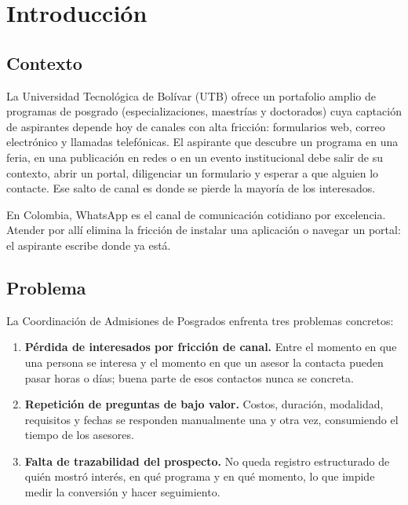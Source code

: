 \documentclass[12pt,a4paper]{report}
\begin{document}
\section{Introducción}

\subsection{Contexto}

La Universidad Tecnológica de Bolívar (UTB) ofrece un portafolio amplio de programas de posgrado
(especializaciones, maestrías y doctorados) cuya captación de aspirantes depende hoy de canales
con alta fricción: formularios web, correo electrónico y llamadas telefónicas. El aspirante que
descubre un programa en una feria, en una publicación en redes o en un evento institucional debe
salir de su contexto, abrir un portal, diligenciar un formulario y esperar a que alguien lo
contacte. Ese salto de canal es donde se pierde la mayoría de los interesados.

En Colombia, WhatsApp es el canal de comunicación cotidiano por excelencia. Atender por allí elimina
la fricción de instalar una aplicación o navegar un portal: el aspirante escribe donde ya está.

\subsection{Problema}

La Coordinación de Admisiones de Posgrados enfrenta tres problemas concretos:

\begin{enumerate}[itemsep=2pt]
    \item \textbf{Pérdida de interesados por fricción de canal.} Entre el momento en que una persona
    se interesa y el momento en que un asesor la contacta pueden pasar horas o días; buena parte de
    esos contactos nunca se concreta.
    \item \textbf{Repetición de preguntas de bajo valor.} Costos, duración, modalidad, requisitos y
    fechas se responden manualmente una y otra vez, consumiendo el tiempo de los asesores.
    \item \textbf{Falta de trazabilidad del prospecto.} No queda registro estructurado de quién
    mostró interés, en qué programa y en qué momento, lo que impide medir la conversión y hacer
    seguimiento.
\end{enumerate}
\end{document}
